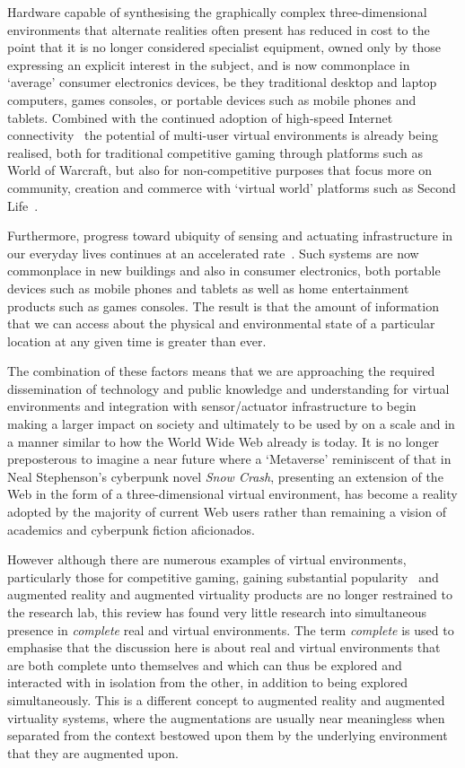 Hardware capable of synthesising the graphically complex three-dimensional environments that alternate realities often present has reduced in cost to the point that it is no longer considered specialist equipment, owned only by those expressing an explicit interest in the subject, and is now commonplace in `average' consumer electronics devices, be they traditional desktop and laptop computers, games consoles, or portable devices such as mobile phones and tablets. Combined with the continued adoption of high-speed Internet connectivity~\cite{Cisco2011} the potential of multi-user virtual environments is already being realised, both for traditional competitive gaming through platforms such as World of Warcraft, but also for non-competitive purposes that focus more on community, creation and commerce with `virtual world' platforms such as Second Life~\cite{Sevan2008}.

Furthermore, progress toward ubiquity of sensing and actuating infrastructure in our everyday lives continues at an accelerated rate~\cite{Bose2009, Baronti2007}. Such systems are now commonplace in new buildings and also in consumer electronics, both portable devices such as mobile phones and tablets as well as home entertainment products such as games consoles. The result is that the amount of information that we can access about the physical and environmental state of a particular location at any given time is greater than ever.

The combination of these factors means that we are approaching the required dissemination of technology and public knowledge and understanding for virtual environments and integration with sensor/actuator infrastructure to begin making a larger impact on society and ultimately to be used by on a scale and in a manner similar to how the World Wide Web already is today. It is no longer preposterous to imagine a near future where a `Metaverse' reminiscent of that in Neal Stephenson's cyberpunk novel \textit{Snow Crash}, presenting an extension of the Web in the form of a three-dimensional virtual environment, has become a reality adopted by the majority of current Web users rather than remaining a vision of academics and cyberpunk fiction aficionados.

However although there are numerous examples of virtual environments, particularly those for competitive gaming, gaining substantial popularity~\cite{Sevan2008} and augmented reality and augmented virtuality products are no longer restrained to the research lab, this review has found very little research into simultaneous presence in \textit{complete} real and virtual environments. The term \textit{complete} is used to emphasise that the discussion here is about real and virtual environments that are both complete unto themselves and which can thus be explored and interacted with in isolation from the other, in addition to being explored simultaneously. This is a different concept to augmented reality and augmented virtuality systems, where the augmentations are usually near meaningless when separated from the context bestowed upon them by the underlying environment that they are augmented upon.

